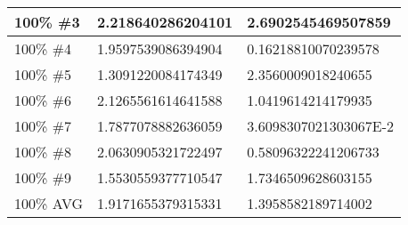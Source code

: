 \begin{longtable}{ | X | X | X | }
	100\% \#3 & 2.218640286204101 & 2.6902545469507859 \\ \hline
	100\% \#4 & 1.9597539086394904 & 0.16218810070239578 \\ \hline
	100\% \#5 & 1.3091220084174349 & 2.3560009018240655 \\ \hline
	100\% \#6 & 2.1265561614641588 & 1.0419614214179935 \\ \hline
	100\% \#7 & 1.7877078882636059 & 3.6098307021303067E-2 \\ \hline
	100\% \#8 & 2.0630905321722497 & 0.58096322241206733 \\ \hline
	100\% \#9 & 1.5530559377710547 & 1.7346509628603155 \\ \hline
	100\% AVG & 1.9171655379315331 & 1.3958582189714002 \\ \hline
\end{longtable}